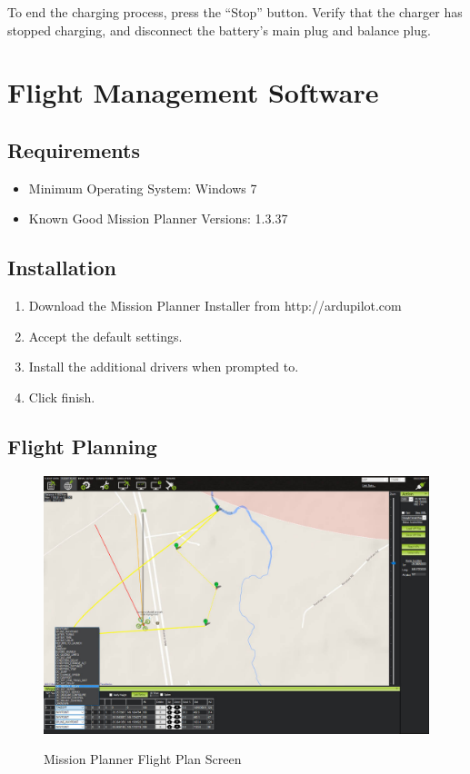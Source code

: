 \documentclass{report}
\begin{document}
		To end the charging process, press the ``Stop'' button.  Verify that the charger has stopped charging, and disconnect the battery's main plug and balance plug.
\chapter{Flight Management Software}
	\section{Requirements}
		\begin{itemize}
			\item Minimum Operating System: Windows 7
			\item Known Good Mission Planner Versions: 1.3.37
		\end{itemize}
	\section{Installation}
		\begin{enumerate}
			\item Download the Mission Planner Installer from http://ardupilot.com
			\item Accept the default settings.
			\item Install the additional drivers when prompted to.
			\item Click finish.
		\end{enumerate}
	\section{Flight Planning}
		\begin{figure}[ht]
			\centering
			\caption{Mission Planner Flight Plan Screen}
			\includegraphics[width=\textwidth]{mp_flight_plan_screen.jpg}
			\label{fig:mp_flight_plan}
		\end{figure}
\end{document}

